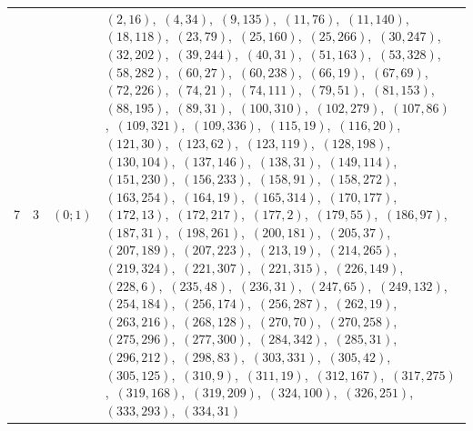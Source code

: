 \documentclass[11pt]{article}
\begin{document}
\begin{longtable}{@{}rrl>{\raggedright\arraybackslash}p{}@{}}
7 & 3 & $(0;1)$ & $(2,16)$,\allowbreak\ $(4,34)$,\allowbreak\ $(9,135)$,\allowbreak\ $(11,76)$,\allowbreak\ $(11,140)$,\allowbreak\ $(18,118)$,\allowbreak\ $(23,79)$,\allowbreak\ $(25,160)$,\allowbreak\ $(25,266)$,\allowbreak\ $(30,247)$,\allowbreak\ $(32,202)$,\allowbreak\ $(39,244)$,\allowbreak\ $(40,31)$,\allowbreak\ $(51,163)$,\allowbreak\ $(53,328)$,\allowbreak\ $(58,282)$,\allowbreak\ $(60,27)$,\allowbreak\ $(60,238)$,\allowbreak\ $(66,19)$,\allowbreak\ $(67,69)$,\allowbreak\ $(72,226)$,\allowbreak\ $(74,21)$,\allowbreak\ $(74,111)$,\allowbreak\ $(79,51)$,\allowbreak\ $(81,153)$,\allowbreak\ $(88,195)$,\allowbreak\ $(89,31)$,\allowbreak\ $(100,310)$,\allowbreak\ $(102,279)$,\allowbreak\ $(107,86)$,\allowbreak\ $(109,321)$,\allowbreak\ $(109,336)$,\allowbreak\ $(115,19)$,\allowbreak\ $(116,20)$,\allowbreak\ $(121,30)$,\allowbreak\ $(123,62)$,\allowbreak\ $(123,119)$,\allowbreak\ $(128,198)$,\allowbreak\ $(130,104)$,\allowbreak\ $(137,146)$,\allowbreak\ $(138,31)$,\allowbreak\ $(149,114)$,\allowbreak\ $(151,230)$,\allowbreak\ $(156,233)$,\allowbreak\ $(158,91)$,\allowbreak\ $(158,272)$,\allowbreak\ $(163,254)$,\allowbreak\ $(164,19)$,\allowbreak\ $(165,314)$,\allowbreak\ $(170,177)$,\allowbreak\ $(172,13)$,\allowbreak\ $(172,217)$,\allowbreak\ $(177,2)$,\allowbreak\ $(179,55)$,\allowbreak\ $(186,97)$,\allowbreak\ $(187,31)$,\allowbreak\ $(198,261)$,\allowbreak\ $(200,181)$,\allowbreak\ $(205,37)$,\allowbreak\ $(207,189)$,\allowbreak\ $(207,223)$,\allowbreak\ $(213,19)$,\allowbreak\ $(214,265)$,\allowbreak\ $(219,324)$,\allowbreak\ $(221,307)$,\allowbreak\ $(221,315)$,\allowbreak\ $(226,149)$,\allowbreak\ $(228,6)$,\allowbreak\ $(235,48)$,\allowbreak\ $(236,31)$,\allowbreak\ $(247,65)$,\allowbreak\ $(249,132)$,\allowbreak\ $(254,184)$,\allowbreak\ $(256,174)$,\allowbreak\ $(256,287)$,\allowbreak\ $(262,19)$,\allowbreak\ $(263,216)$,\allowbreak\ $(268,128)$,\allowbreak\ $(270,70)$,\allowbreak\ $(270,258)$,\allowbreak\ $(275,296)$,\allowbreak\ $(277,300)$,\allowbreak\ $(284,342)$,\allowbreak\ $(285,31)$,\allowbreak\ $(296,212)$,\allowbreak\ $(298,83)$,\allowbreak\ $(303,331)$,\allowbreak\ $(305,42)$,\allowbreak\ $(305,125)$,\allowbreak\ $(310,9)$,\allowbreak\ $(311,19)$,\allowbreak\ $(312,167)$,\allowbreak\ $(317,275)$,\allowbreak\ $(319,168)$,\allowbreak\ $(319,209)$,\allowbreak\ $(324,100)$,\allowbreak\ $(326,251)$,\allowbreak\ $(333,293)$,\allowbreak\ $(334,31)$\\

\end{longtable}
\end{document}
